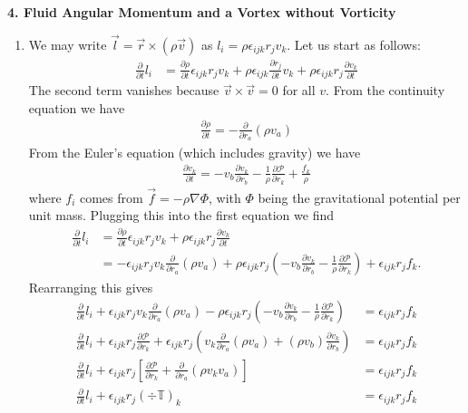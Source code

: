 \documentclass{article}
\theoremstyle{definition}
\newcommand{\p}{\partial}
\newcommand{\f}[2]{\frac{#1}{#2}}
\newcommand{\lp}{\left(}
\newcommand{\rp}{\right)}
\newcommand{\lb}{\left[}
\newcommand{\rb}{\right]}
\begin{document}
\noindent \textbf{4. Fluid Angular Momentum and a Vortex without Vorticity}

\begin{enumerate}[label=(\alph*)]
	\item We may write $\vec{l} = \vec{r}\times (\rho \vec{v})$ as $l_i = \rho \epsilon_{ijk} r_j v_k $. Let us start as follows:
	\begin{align*}
	\f{\p }{\p t} l_i &= \f{\p \rho}{\p t} \epsilon_{ijk} r_j v_k +  \rho \epsilon_{ijk} \f{\p r_j}{\p t} v_k + \rho \epsilon_{ijk} r_j \f{\p v_k}{\p t}
	\end{align*}
	The second term vanishes because $\vec{v}\times \vec{v} = 0$ for all $v$. From the continuity equation we have
	\begin{align*}
	\f{\p \rho}{\p t} = -\f{\p}{\p r_a} (\rho v_a)
	\end{align*}
	From the Euler's equation (which includes gravity) we have
	\begin{align*}
	\f{\p v_k}{\p t} = -v_b \f{\p v_k}{\p r_b} - \f{1}{\rho} \f{\p \mathcal{P}}{\p r_k} +\f{ f_k}{\rho}
	\end{align*}
	where $f_i$ comes from $\vec{f} = -\rho \nabla \Phi$, with $\Phi$ being the gravitational potential per unit mass. Plugging this into the first equation we find 
	\begin{align*}
	\f{\p }{\p t} l_i &= \f{\p \rho}{\p t} \epsilon_{ijk} r_j v_k +\rho \epsilon_{ijk} r_j \f{\p v_k}{\p t}\\
	&= -\epsilon_{ijk} r_j v_k \f{\p}{\p r_a} (\rho v_a) + \rho \epsilon_{ijk} r_j \lp -v_b \f{\p v_k}{\p r_b} - \f{1}{\rho} \f{\p \mathcal{P}}{\p r_k} \rp + \epsilon_{ijk} r_j f_k.
	\end{align*}
	Rearranging this gives
	\begin{align*}
	\f{\p }{\p t} l_i + \epsilon_{ijk} r_j v_k \f{\p}{\p r_a} (\rho v_a) - \rho \epsilon_{ijk} r_j \lp -v_b \f{\p v_k}{\p r_b} - \f{1}{\rho} \f{\p \mathcal{P}}{\p r_k} \rp &= \epsilon_{ijk} r_j f_k\\
	\f{\p }{\p t} l_i  +  \epsilon_{ijk} r_j\f{\p \mathcal{P}}{\p r_k} + \epsilon_{ijk} r_j \lp v_k \f{\p}{\p r_a}(\rho v_a) + (\rho v_b) \f{\p v_k}{\p r_b}\rp &= \epsilon_{ijk} r_j f_k \\
	\f{\p }{\p t} l_i + \epsilon_{ijk} r_j \lb  \f{\p \mathcal{P}}{\p r_k} + \f{\p }{\p r_a}(\rho v_k v_a)  \rb   &= \epsilon_{ijk} r_j f_k \\
	\f{\p}{\p t} l_i + \epsilon_{ijk} r_j (\div \mathbb{T})_k &= \epsilon_{ijk} r_j f_k 
	\end{align*}

\end{enumerate}
\end{document}
